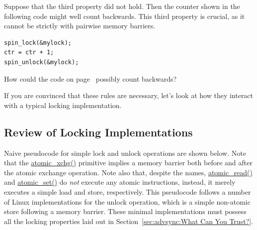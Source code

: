 Suppose that the third property did not hold.
Then the counter shown in the following code might well count backwards.
This third property is crucial, as it cannot be strictly with
pairwise memory barriers.

\vspace{5pt}
\begin{minipage}[t]{\columnwidth}
\begin{verbatim}
spin_lock(&mylock);
ctr = ctr + 1;
spin_unlock(&mylock);
\end{verbatim}
\end{minipage}
\label{codesample:advsync:What Can You Count On? 3}
\vspace{5pt}

\QuickQuiz{}
	How could the code on
	page~\pageref{codesample:advsync:What Can You Count On? 2}
	possibly count backwards?
 \QuickQuizEnd

If you are convinced that these rules are necessary, let's look at how
they interact with a typical locking implementation.

\subsection{Review of Locking Implementations}
\label{sec:advsync:Review of Locking Implementations}

Naive pseudocode for simple lock and unlock operations are shown below.
Note that the \url{atomic_xchg()} primitive implies a memory barrier
both before and after the atomic exchange operation.
Note also that, despite the names, \url{atomic_read()} and
\url{atomic_set()} do \emph{not}
execute any atomic instructions, instead, it merely executes a
simple load and store, respectively.
This pseudocode follows a number of Linux implementations for
the unlock operation, which is a simple non-atomic store following a
memory barrier.
These minimal implementations must possess all the locking properties
laid out in Section~\ref{sec:advsync:What Can You Trust?}.

